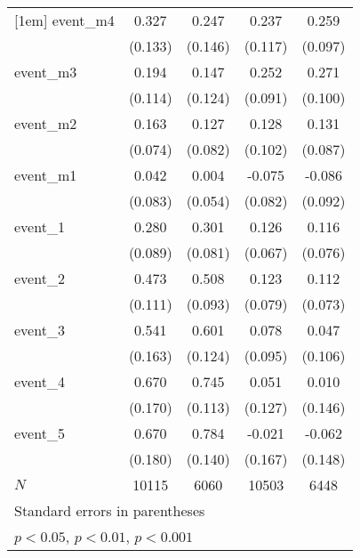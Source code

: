 {\begin{tabular}{l*{4}{c}}
[1em]
event\_m4    &       0.327\sym{*}  &       0.247         &       0.237\sym{*}  &       0.259\sym{**} \\
            &     (0.133)         &     (0.146)         &     (0.117)         &     (0.097)         \\
[1em]
event\_m3    &       0.194         &       0.147         &       0.252\sym{**} &       0.271\sym{**} \\
            &     (0.114)         &     (0.124)         &     (0.091)         &     (0.100)         \\
[1em]
event\_m2    &       0.163\sym{*}  &       0.127         &       0.128         &       0.131         \\
            &     (0.074)         &     (0.082)         &     (0.102)         &     (0.087)         \\
[1em]
event\_m1    &       0.042         &       0.004         &      -0.075         &      -0.086         \\
            &     (0.083)         &     (0.054)         &     (0.082)         &     (0.092)         \\
[1em]
event\_1     &       0.280\sym{**} &       0.301\sym{***}&       0.126         &       0.116         \\
            &     (0.089)         &     (0.081)         &     (0.067)         &     (0.076)         \\
[1em]
event\_2     &       0.473\sym{***}&       0.508\sym{***}&       0.123         &       0.112         \\
            &     (0.111)         &     (0.093)         &     (0.079)         &     (0.073)         \\
[1em]
event\_3     &       0.541\sym{***}&       0.601\sym{***}&       0.078         &       0.047         \\
            &     (0.163)         &     (0.124)         &     (0.095)         &     (0.106)         \\
[1em]
event\_4     &       0.670\sym{***}&       0.745\sym{***}&       0.051         &       0.010         \\
            &     (0.170)         &     (0.113)         &     (0.127)         &     (0.146)         \\
[1em]
event\_5     &       0.670\sym{***}&       0.784\sym{***}&      -0.021         &      -0.062         \\
            &     (0.180)         &     (0.140)         &     (0.167)         &     (0.148)         \\
\hline
\(N\)       &       10115         &        6060         &       10503         &        6448         \\
\hline\hline
\multicolumn{5}{l}{\footnotesize Standard errors in parentheses}\\
\multicolumn{5}{l}{\footnotesize \sym{*} \(p<0.05\), \sym{**} \(p<0.01\), \sym{***} \(p<0.001\)}\\
\end{tabular}
}
